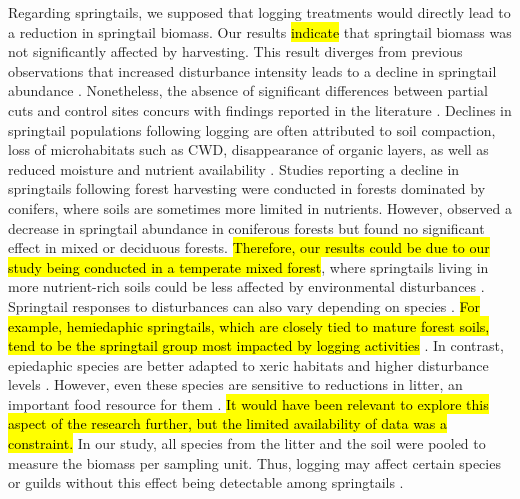 Regarding springtails, we supposed that logging treatments would directly lead to a reduction in springtail biomass. 
Our results \hl{indicate} that springtail biomass was not significantly affected by harvesting. 
This result diverges from previous observations that increased disturbance intensity leads to a decline in springtail abundance \citep{Lindo2004Forestfloor,Laigle2021Directindirect,Kudrin2023metaanalysiseffects}. 
Nonetheless, the absence of significant differences between partial cuts and control sites concurs with findings reported in the literature \citep{Kudrin2023metaanalysiseffects}. 
Declines in springtail populations following logging are often attributed to soil compaction, loss of microhabitats such as CWD, 
disappearance of organic layers, as well as reduced moisture and nutrient availability \citep{Bird1986Effectwholetree,Baath1995Microbialcommunity,Lindo2004Forestfloor,rousseauForestFloorMesofauna2018}. 
Studies reporting a decline in springtails following forest harvesting were conducted in forests dominated by conifers, where soils are sometimes more limited in nutrients. 
However, \cite{Kudrin2023metaanalysiseffects} observed a decrease in springtail abundance in coniferous forests but found no significant effect in mixed or deciduous forests. 
\hl{Therefore, our results could be due to our study being conducted in a temperate mixed forest}, where springtails living in more nutrient-rich soils could be less affected by environmental disturbances \citep{chauvatChangesSoilFaunal2011a}. 
Springtail responses to disturbances can also vary depending on species \citep{raymond-leonardSpringtailCommunityStructure2018a}. 
\hl{For example, hemiedaphic springtails, which are closely tied to mature forest soils, tend to be the springtail group most impacted by logging activities} \citep{Laigle2021Directindirect}. 
In contrast, epiedaphic species are better adapted to xeric habitats and higher disturbance levels \citep{Makkonen2011Traitsexplain,rousseauWoodyBiomassRemoval2019}. 
However, even these species are sensitive to reductions in litter, an important food resource for them \citep{rousseauForestFloorMesofauna2018}. 
\hl{It would have been relevant to explore this aspect of the research further, but the limited availability of data was a constraint. }
In our study, all species from the litter and the soil were pooled to measure the biomass per sampling unit. 
Thus, logging may affect certain species or guilds without this effect being detectable among springtails \citep{Addison1998Responsesoil}. 


